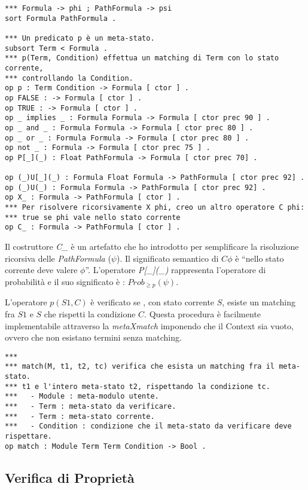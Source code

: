 \begin{Verbatim}[fontsize=\small]
*** Formula -> phi ; PathFormula -> psi
sort Formula PathFormula .

*** Un predicato p è un meta-stato.
subsort Term < Formula .
*** p(Term, Condition) effettua un matching di Term con lo stato corrente,
*** controllando la Condition.
op p : Term Condition -> Formula [ ctor ] .
op FALSE : -> Formula [ ctor ] .
op TRUE : -> Formula [ ctor ] .
op _ implies _ : Formula Formula -> Formula [ ctor prec 90 ] .
op _ and _ : Formula Formula -> Formula [ ctor prec 80 ] .
op _ or _ : Formula Formula -> Formula [ ctor prec 80 ] .
op not _ : Formula -> Formula [ ctor prec 75 ] .
op P[_](_) : Float PathFormula -> Formula [ ctor prec 70] .

op (_)U[_](_) : Formula Float Formula -> PathFormula [ ctor prec 92] .
op (_)U(_) : Formula Formula -> PathFormula [ ctor prec 92] .
op X_ : Formula -> PathFormula [ ctor ] .
*** Per risolvere ricorsivamente X phi, creo un altro operatore C phi:
*** true se phi vale nello stato corrente
op C_ : Formula -> PathFormula [ ctor ] .
\end{Verbatim}

Il costruttore \emph{C\_} è un artefatto che ho introdotto per semplificare la
risoluzione ricorsiva delle \emph{PathFormula} ($\psi$). Il significato
semantico di $C\phi$ è ``nello stato corrente deve valere $\phi$''.
L'operatore \emph{P[\_](\_)} rappresenta l'operatore di probabilità e il suo
significato è : $Prob_{\geq p}(\psi)$.

L'operatore $p(S1, C)$ è verificato se , con stato corrente $S$, esiste un
matching fra $S1$ e $S$ che rispetti la condizione $C$. Questa procedura è
facilmente implementabile attraverso la \emph{metaXmatch} imponendo che il
Context sia vuoto, ovvero che non esistano termini senza matching.

 \begin{Verbatim}[fontsize=\small]
***
*** match(M, t1, t2, tc) verifica che esista un matching fra il meta-stato.
*** t1 e l'intero meta-stato t2, rispettando la condizione tc.
***   - Module : meta-modulo utente.
***   - Term : meta-stato da verificare.
***   - Term : meta-stato corrente.
***   - Condition : condizione che il meta-stato da verificare deve rispettare.
op match : Module Term Term Condition -> Bool .
\end{Verbatim}

\subsection{Verifica di Proprietà}

